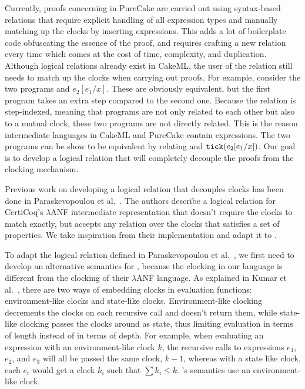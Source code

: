 Currently, proofs concerning \ThunkLang{} in PureCake are carried out using
syntax-based relations that require explicit handling of all expression types
and manually matching up the clocks by inserting  expressions. This
adds a lot of boilerplate code obfuscating the essence of the proof, and
requires crafting a new relation every time which comes at the cost of time,
complexity, and duplication. Although logical relations already exist in CakeML,
the user of the relation still needs to match up the clocks when carrying out
proofs. For example, consider the two programs 
and $e_2[e_1/x]$. These are obviously equivalent, but the first program takes an
extra step compared to the second one. Because the relation is step-indexed,
meaning that programs are not only related to each other but also to a mutual
clock, these two programs are not directly related. This is the reason
intermediate languages in CakeML and PureCake contain  expressions.
The two programs can be show to be equivalent by relating  and $\texttt{tick} (e_2[e_1/x])$. Our goal is to develop a logical
relation that will completely decouple the proofs from the clocking mechanism.

Previous work on developing a logical relation that decouples clocks has been
done in Paraskevopoulou et al.~\cite{paraskevopoulou2021compositional}. The
authors describe a logical relation for CertiCoq's $\lambda$ANF intermediate
representation that doesn't require the clocks to match exactly, but accepts any
relation over the clocks that satisfies a set of properties. We take inspiration
from their implementation and adapt it to \ThunkLang{}.

To adapt the logical relation defined in Paraskevopoulou et
al.~\cite{paraskevopoulou2021compositional}, we first need to develop an
alternative semantics for \ThunkLang{}, because the clocking in our language is
different from the clocking of their $\lambda$ANF language. As explained in
Kumar et al.~\cite{kumar2018clocked}, there are two ways of embedding clocks in
evaluation functions: environment-like clocks and state-like clocks.
Environment-like clocking decrements the clocks on each recursive call and
doesn't return them, while state-like clocking passes the clocks around as
state, thus limiting evaluation in terms of length instead of in terms of depth.
For example, when evaluating an  expression with an
environment-like clock $k$, the recursive calls to expressions $e_1$, $e_2$, and
$e_3$ will all be passed the same clock, $k - 1$, whereas with a state like
clock, each $e_i$ would get a clock $k_i$ such that $\sum k_i \le k$.
\ThunkLang{}'s semantics use an environment-like clock.

